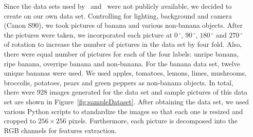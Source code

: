 \documentclass{article} %
\begin{document}
Since the data sets used by~\citet{saad2009recognizing} and~\citet{paulraj2009color} were not publicly available, we decided to create on our own data set. Controlling for lighting, background and camera (Canon S90), we took pictures of banana and various non-banana objects. After the pictures were taken, we incorporated each picture at $0\,^{\circ}$, $90\,^{\circ}$, $180\,^{\circ}$ and  $270\,^{\circ}$ of rotation to increase the number of pictures in the data set by four fold. Also, there were equal number of pictures for each of the four labels: unripe banana, ripe banana, overripe banana and non-banana. For the banana data set, twelve unique bananas were used. We used apples, tomatoes, lemons, limes, mushrooms, broccolis, potatoes, pears and green peppers as non-banana objects. In total, there were 928 images generated for the data set and sample pictures of this data set are shown in Figure~\ref{fig:sampleDataset}. After obtaining the data set, we used various Python scripts to standardize the images so that each one is resized and cropped to $256\times 256$ pixels. Furthermore, each picture is decomposed into the RGB channels for features extraction. 
\end{document}
